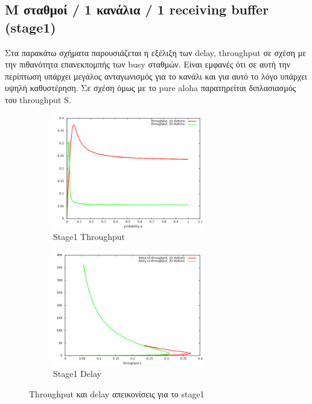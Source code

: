 \documentclass[12pt]{report}
\begin{document}
\subsection{\textlatin{M} σταθμοί / 1 κανάλια / 1 \textlatin{receiving buffer} (\textlatin{stage1})}
Στα παρακάτω σχήματα παρουσιάζεται η εξέλιξη των \textlatin{delay, throughput} σε σχέση με την πιθανότητα επανεκπομπής των \textlatin{busy} σταθμών. Είναι εμφανές ότι σε αυτή την περίπτωση υπάρχει μεγάλος ανταγωνισμός για το κανάλι και για αυτό το λόγο υπάρχει υψηλή καθυστέρηση. Σε σχέση όμως με το \textlatin{pure aloha} παρατηρείται διπλασιασμός του \textlatin{throughput S}.
\begin{figure}[h]
\begin{subfigure}{0.5\textwidth}
\includegraphics[width=0.9\linewidth, height=5cm]{st1_throughput} 
\caption{\textlatin{Stage1 Throughput}}
\label{fig:st1_throughput}
\end{subfigure}
\begin{subfigure}{0.5\textwidth}
\includegraphics[width=0.9\linewidth, height=5cm]{st1_delay}
\caption{\textlatin{Stage1 Delay}}
\label{fig:st1_delay}
\end{subfigure}
 
\caption{\textlatin{Throughput} και \textlatin{delay} απεικονίσεις για το \textlatin{stage1}}
\label{fig:Stage1}
\end{figure}
\end{document}
